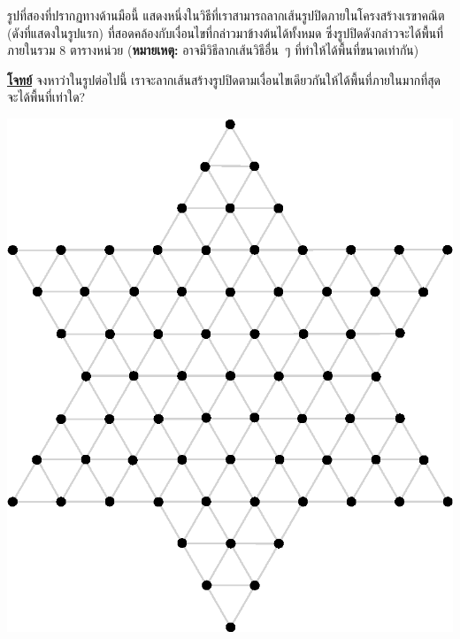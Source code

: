 รูปที่สองที่ปรากฏทางด้านมือนี้
แสดงหนึ่งในวิธีที่เราสามารถลากเส้นรูปปิดภายในโครงสร้างเรขาคณิต (ดังที่แสดงในรูปแรก)
ที่สอดคล้องกับเงื่อนไขที่กล่าวมาข้างต้นได้ทั้งหมด ซึ่งรูปปิดดังกล่าวจะได้พื้นที่ภายในรวม 8 ตารางหน่วย\;
(\textbf{หมายเหตุ:} อาจมีวิธีลากเส้นวิธีอื่น~ๆ ที่ทำให้ได้พื้นที่ขนาดเท่ากัน)

\medskip\noindent
\textbf{\uline{โจทย์}}\; 
จงหาว่าในรูปต่อไปนี้ เราจะลากเส้นสร้างรูปปิดตามเงื่อนไขเดียวกันให้ได้พื้นที่ภายในมากที่สุด จะได้พื้นที่เท่าใด?
\begin{center}
    \includegraphics[width=0.7\linewidth]{figures/quickfire_central_regional_closedshapearea_03.eps}
\end{center}